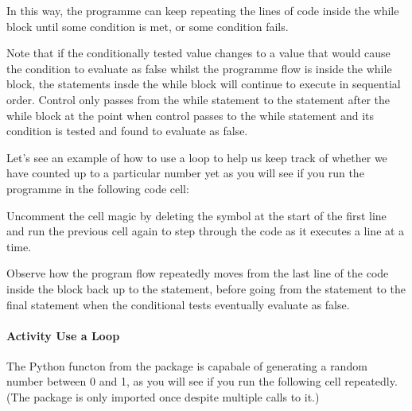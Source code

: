 \documentclass[letterpaper,10pt,english]{sphinxmanual}
\begin{document}
{In this way, the programme can keep repeating the lines of code inside the while block until some condition is met, or some condition fails.

Note that if the conditionally tested value changes to a value that would cause the condition to evaluate as false whilst the programme flow is inside the while block, the statements insde the while block will continue to execute in sequential order. Control only passes from the while statement to the statement after the while block at the point when control passes to the while statement and its condition is tested and found to evaluate as false.

Let’s see an example of how to use a  loop to help us keep track of whether we have counted up to a particular number yet as you will see if you run the programme in the following code cell:

\begin{sphinxVerbatim}[commandchars=\\\{\}]
  

   
        

\end{sphinxVerbatim}

Uncomment the cell magic by deleting the \sphinxcode{\sphinxupquote{\#}} symbol at the start of the first line and run the previous cell again to step through the code as it executes a line at a time.

Observe how the program flow repeatedly moves from the last line of the code inside the  block back up to the  statement, before going from the  statement to the final  statement when the conditional tests eventually evaluate as false.


\paragraph{Activity \sphinxhyphen{} Use a  Loop}
\label{\detokenize{content/02_Robot_Lab/Section_00_01:Activity---Use-a-while-Loop}}
The Python  functon from the  package is capabale of generating a random number between 0 and 1, as you will see if you run the following cell repeatedly. (The package is only imported once despite multiple calls to it.)

}
\end{document}
